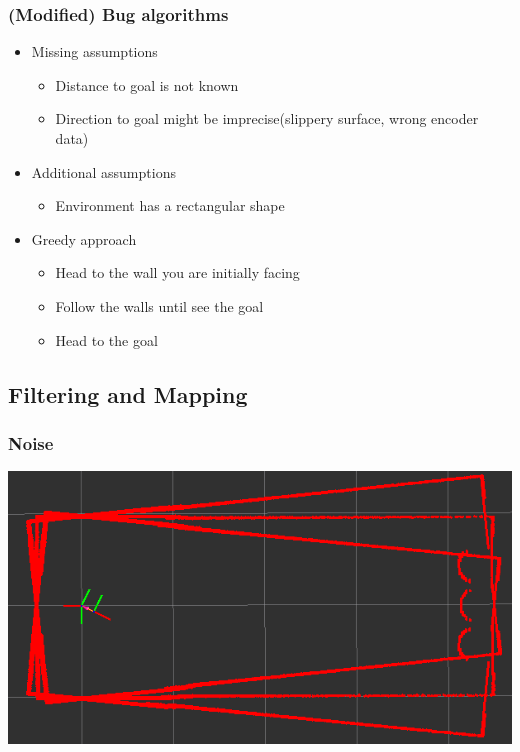 \documentclass{beamer}
\begin{document}
\begin{frame}
\frametitle{(Modified) Bug algorithms}
\begin{itemize}
\item Missing assumptions
\begin{itemize}
\item Distance to goal is not known
\item Direction to goal might be imprecise(slippery surface, wrong encoder data)
\end{itemize}
\item Additional assumptions
\begin{itemize}
\item Environment has a rectangular shape
\end{itemize}
\item Greedy approach
\begin{itemize}
\item Head to the wall you are initially facing
\item Follow the walls until see the goal
\item Head to the goal
\end{itemize}
\end{itemize}
\end{frame}

\subsection{Filtering and Mapping}
\begin{frame}
\frametitle{Noise}
\includegraphics[scale=0.5]{assets/images/Noise.png}
\end{frame}
\end{document}
